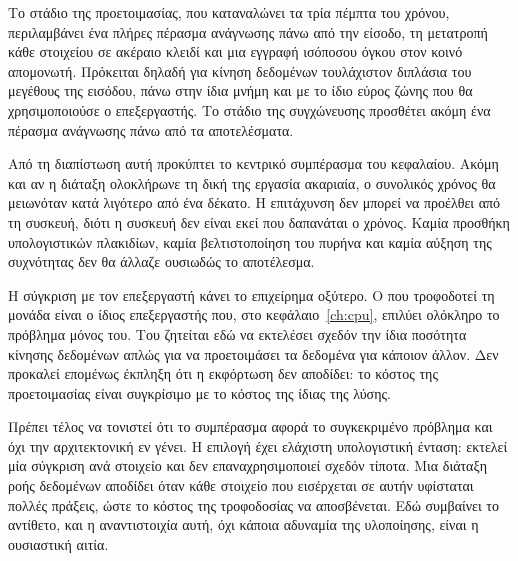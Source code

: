 Το στάδιο της προετοιμασίας, που καταναλώνει τα τρία πέμπτα του χρόνου,
περιλαμβάνει ένα πλήρες πέρασμα ανάγνωσης πάνω από την είσοδο, τη μετατροπή κάθε
στοιχείου σε ακέραιο κλειδί και μια εγγραφή ισόποσου όγκου στον κοινό απομονωτή.
Πρόκειται δηλαδή για κίνηση δεδομένων τουλάχιστον διπλάσια του μεγέθους της
εισόδου, πάνω στην ίδια μνήμη και με το ίδιο εύρος ζώνης που θα χρησιμοποιούσε ο
επεξεργαστής. Το στάδιο της συγχώνευσης προσθέτει ακόμη ένα πέρασμα ανάγνωσης
πάνω από τα αποτελέσματα.

Από τη διαπίστωση αυτή προκύπτει το κεντρικό συμπέρασμα του κεφαλαίου. Ακόμη και
αν η διάταξη ολοκλήρωνε τη δική της εργασία ακαριαία, ο συνολικός χρόνος θα
μειωνόταν κατά λιγότερο από ένα δέκατο. Η επιτάχυνση δεν μπορεί να προέλθει από
τη συσκευή, διότι η συσκευή δεν είναι εκεί που δαπανάται ο χρόνος. Καμία
προσθήκη υπολογιστικών πλακιδίων, καμία βελτιστοποίηση του πυρήνα και καμία
αύξηση της συχνότητας δεν θα άλλαζε ουσιωδώς το αποτέλεσμα.

Η σύγκριση με τον επεξεργαστή κάνει το επιχείρημα οξύτερο. Ο  που
τροφοδοτεί τη μονάδα είναι ο ίδιος επεξεργαστής που, στο
κεφάλαιο~\ref{ch:cpu}, επιλύει ολόκληρο το πρόβλημα μόνος του. Του ζητείται εδώ
να εκτελέσει σχεδόν την ίδια ποσότητα κίνησης δεδομένων απλώς για να
προετοιμάσει τα δεδομένα για κάποιον άλλον. Δεν προκαλεί επομένως έκπληξη ότι η
εκφόρτωση δεν αποδίδει: το κόστος της προετοιμασίας είναι συγκρίσιμο με το
κόστος της ίδιας της λύσης.

Πρέπει τέλος να τονιστεί ότι το συμπέρασμα αφορά το συγκεκριμένο πρόβλημα και
όχι την αρχιτεκτονική εν γένει. Η επιλογή  έχει ελάχιστη υπολογιστική
ένταση: εκτελεί μία σύγκριση ανά στοιχείο και δεν επαναχρησιμοποιεί σχεδόν
τίποτα. Μια διάταξη ροής δεδομένων αποδίδει όταν κάθε στοιχείο που εισέρχεται σε
αυτήν υφίσταται πολλές πράξεις, ώστε το κόστος της τροφοδοσίας να αποσβένεται.
Εδώ συμβαίνει το αντίθετο, και η αναντιστοιχία αυτή, όχι κάποια αδυναμία της
υλοποίησης, είναι η ουσιαστική αιτία.
